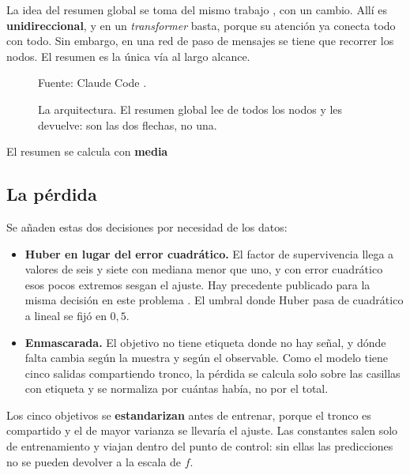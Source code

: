 La idea del resumen global se toma del mismo trabajo \cite{bao2025gtraqem}, con un cambio. Allí
es \textbf{unidireccional}, y en un \textit{transformer} basta, porque su atención ya conecta
todo con todo. Sin embargo, en una red de paso de mensajes se tiene que recorrer los nodos. El resumen es la única vía al largo alcance.

\begin{figure}[!ht]
    \centering
    \caption{La arquitectura. El resumen global lee de todos los nodos y les devuelve: son
             las dos flechas, no una.}
    \label{fig:gnn_arq}

    

    {\footnotesize Fuente: Claude Code \cite{anthropic_claude}.}
\end{figure}

El resumen se calcula con \textbf{media}

\subsection*{La pérdida}

Se añaden estas dos decisiones por necesidad de los datos:

\begin{itemize}
    \item \textbf{Huber en lugar del error cuadrático.} El factor de supervivencia llega a
          valores de seis y siete con mediana menor que uno, y con error cuadrático esos pocos
          extremos sesgan el ajuste. Hay precedente publicado para la misma decisión en este
          problema \cite{aktar2024graph}. El umbral donde Huber pasa de cuadrático a lineal se fijó en $0{,}5$. 
    \item \textbf{Enmascarada.} El objetivo no tiene etiqueta donde no hay señal, y dónde falta
          cambia según la muestra y según el observable. Como el modelo tiene cinco salidas
          compartiendo tronco, la pérdida se calcula solo sobre las casillas con etiqueta y se
          normaliza por cuántas había, no por el total.
\end{itemize}

Los cinco objetivos se \textbf{estandarizan} antes de entrenar, porque el tronco es compartido
y el de mayor varianza se llevaría el ajuste. Las constantes salen solo de entrenamiento y
viajan dentro del punto de control: sin ellas las predicciones no se pueden devolver a la
escala de $f$.

